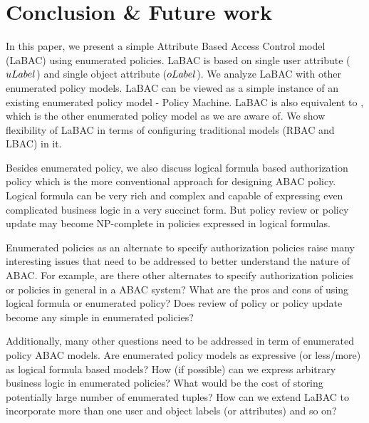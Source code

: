 \section{Conclusion \& Future work}
\label{sec:conclusion}


In this paper, we present a simple Attribute Based Access Control model (LaBAC) using enumerated policies. LaBAC is based on single user attribute ($uLabel$) and single object attribute ($oLabel$). We analyze LaBAC with other enumerated policy models. LaBAC can be viewed as a simple instance of an existing enumerated policy model - Policy Machine. LaBAC is also equivalent to \twoSortedRBAC{}, which is the other enumerated policy model as we are aware of. We show flexibility of LaBAC in terms of configuring traditional models (RBAC and LBAC) in it. 

Besides enumerated policy, we also discuss logical formula based authorization policy which is the more conventional approach for designing ABAC policy.  Logical formula can be very rich and complex and capable of expressing even complicated business logic in a very succinct form. But policy review or policy update may become NP-complete in policies expressed in logical formulas. 

Enumerated policies as an alternate to specify authorization policies raise many interesting issues that need to be addressed to better  understand the nature of ABAC. For example, are there other alternates to specify authorization policies or policies in general in a ABAC system? What are the pros and cons of using logical formula or enumerated policy? Does review of policy or policy update become any simple in enumerated policies?  

Additionally, many other questions need to be addressed in term of enumerated policy ABAC models. Are enumerated policy models as expressive (or less/more) as logical formula based models? How (if possible) can we express arbitrary business logic in enumerated policies? What would be the cost of storing potentially large number of enumerated tuples? How can we extend LaBAC to incorporate more than one user and object labels (or attributes) and so on?

